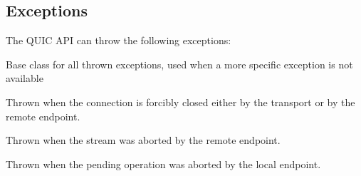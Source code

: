 \subsection{Exceptions}

The QUIC API can throw the following exceptions:

\begin{description}

     Base class for all thrown exceptions, used when a
more specific exception is not available

     Thrown when the connection is
forcibly closed either by the transport or by the remote endpoint.

     Thrown when the stream was aborted by
the remote endpoint.

     Thrown when the pending operation was
aborted by the local endpoint.

\end{description}
